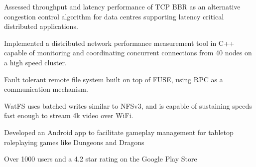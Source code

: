 \documentclass[]{chowes-resume}
\begin{document}
\begin{minipage}[t]{0.66\textwidth}
\begin{tightemize}
\item Assessed throughput and latency performance of TCP BBR as an alternative congestion control algorithm for data centres supporting latency critical distributed applications.
\item Implemented a distributed network performance measurement tool in C++ capable of monitoring and coordinating concurrent connections from 40 nodes on a high speed cluster.
\end{tightemize}
\sectionsep

\begin{tightemize}
\item Fault tolerant remote file system built on top of FUSE, using RPC as a communication mechanism. 
\item WatFS uses batched writes similar to NFSv3, and is capable of sustaining speeds fast enough to stream 4k video over WiFi.
\end{tightemize}
\sectionsep

\begin{tightemize}
\item Developed an Android app to facilitate gameplay management for tabletop roleplaying games like Dungeons and Dragons
\item Over 1000 users and a 4.2 star rating on the Google Play Store
\end{tightemize}
\sectionsep

\end{minipage} 
\end{document}
